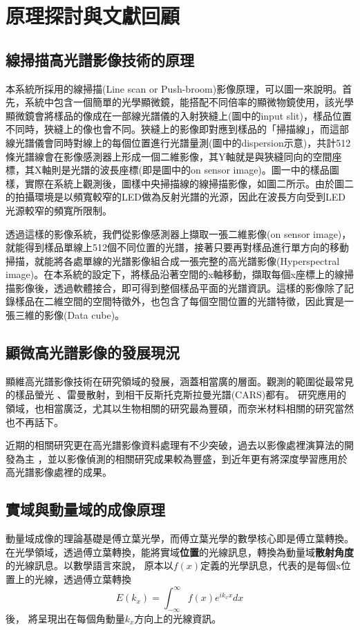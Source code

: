 \documentclass[12pt]{article}
\begin{document}
\section{原理探討與文獻回顧}
\subsection{線掃描高光譜影像技術的原理}
本系統所採用的線掃描(Line scan or Push-broom)影像原理，可以圖一來說明。首先，系統中包含一個簡單的光學顯微鏡，能搭配不同倍率的顯微物鏡使用，該光學顯微鏡會將樣品的像成在一部線光譜儀的入射狹縫上(圖中的input slit)，樣品位置不同時，狹縫上的像也會不同。狹縫上的影像即對應到樣品的「掃描線」，而這部線光譜儀會同時對線上的每個位置進行光譜量測(圖中的dispersion示意)，共計512條光譜線會在影像感測器上形成一個二維影像，其Y軸就是與狹縫同向的空間座標，其X軸則是光譜的波長座標(即是圖中的on sensor image)。圖一中的樣品圖樣，實際在系統上觀測後，圖樣中央掃描線的線掃描影像，如圖二所示。由於圖二的拍攝環境是以頻寬較窄的LED做為反射光譜的光源，因此在波長方向受到LED光源較窄的頻寬所限制。

透過這樣的影像系統，我們從影像感測器上擷取一張二維影像(on sensor image)，就能得到樣品單線上512個不同位置的光譜，接著只要再對樣品進行單方向的移動掃描，就能將各處單線的光譜影像組合成一張完整的高光譜影像(Hyperspectral image)。在本系統的設定下，將樣品沿著空間的x軸移動，擷取每個x座標上的線掃描影像後，透過軟體接合，即可得到整個樣品平面的光譜資訊。這樣的影像除了記錄樣品在二維空間的空間特徵外，也包含了每個空間位置的光譜特徵，因此實是一張三維的影像(Data cube)。

\subsection{顯微高光譜影像的發展現況}
顯維高光譜影像技術在研究領域的發展，涵蓋相當廣的層面。觀測的範圍從最常見的樣品螢光
、雷曼散射，到相干反斯托克斯拉曼光譜(CARS)都有\cite{roth2015hyperspectral,zhang2013quantitative, pegoraro2014hyperspectral}。
研究應用的領域，也相當廣泛，尤其以生物相關的研究最為豐碩\cite{leavesley2012hyperspectral,studer2012compressive}，而奈米材料相關的研究當然也不再話下\cite{roth2015hyperspectral}。

近期的相關研究更在高光譜影像資料處理有不少突破，過去以影像處裡演算法的開發為主
\cite{manolakis2002detection,nascimento2005vertex}
，並以影像偵測的相關研究成果較為豐盛\cite{manolakis2009there}，到近年更有將深度學習應用於高光譜影像處裡的成果\cite{chen2014deep}。
\subsection{實域與動量域的成像原理}
動量域成像的理論基礎是傅立葉光學，而傅立葉光學的數學核心即是傅立葉轉換。在光學領域，透過傅立葉轉換，能將實域\textbf{位置}的光線訊息，轉換為動量域\textbf{散射角度}的光線訊息。以數學語言來說，
原本以\(f(x)\)定義的光學訊息，代表的是每個x位置上的光線，透過傅立葉轉換\[E(k_x)=\int_{-\infty}^{\infty}f(x)e^{ik_xx}dx\]後，
將呈現出在每個角動量\(k_x\)方向上的光線資訊。
\end{document}

